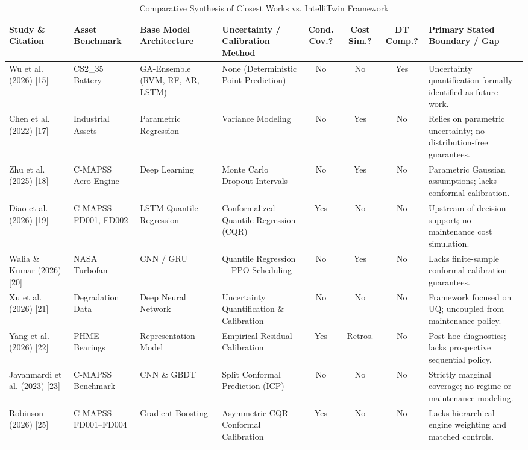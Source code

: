 \documentclass[12pt,a4paper]{article}
\begin{document}
\begin{table}[htbp]
\centering
\caption{Comparative Synthesis of Closest Works vs. IntelliTwin Framework}
\label{tab:closest_works}
\fontsize{8.5pt}{11pt}\selectfont
\begin{tabularx}{\textwidth}{l p{2.2cm} p{2.5cm} p{2.5cm} c c c p{2.5cm}}
\toprule
\textbf{Study \& Citation} & \textbf{Asset Benchmark} & \textbf{Base Model Architecture} & \textbf{Uncertainty / Calibration Method} & \textbf{Cond. Cov.?} & \textbf{Cost Sim.?} & \textbf{DT Comp.?} & \textbf{Primary Stated Boundary / Gap} \\
\midrule
Wu et al. (2026) [15] & CS2\_35 Battery & GA-Ensemble (RVM, RF, AR, LSTM) & None (Deterministic Point Prediction) & No & No & Yes & Uncertainty quantification formally identified as future work. \\
Chen et al. (2022) [17] & Industrial Assets & Parametric Regression & Variance Modeling & No & Yes & No & Relies on parametric uncertainty; no distribution-free guarantees. \\
Zhu et al. (2025) [18] & C-MAPSS Aero-Engine & Deep Learning & Monte Carlo Dropout Intervals & No & Yes & No & Parametric Gaussian assumptions; lacks conformal calibration. \\
Diao et al. (2026) [19] & C-MAPSS FD001, FD002 & LSTM Quantile Regression & Conformalized Quantile Regression (CQR) & Yes & No & No & Upstream of decision support; no maintenance cost simulation. \\
Walia \& Kumar (2026) [20] & NASA Turbofan & CNN / GRU & Quantile Regression + PPO Scheduling & No & Yes & No & Lacks finite-sample conformal calibration guarantees. \\
Xu et al. (2026) [21] & Degradation Data & Deep Neural Network & Uncertainty Quantification \& Calibration & No & No & No & Framework focused on UQ; uncoupled from maintenance policy. \\
Yang et al. (2026) [22] & PHME Bearings & Representation Model & Empirical Residual Calibration & Yes & Retros. & No & Post-hoc diagnostics; lacks prospective sequential policy. \\
Javanmardi et al. (2023) [23] & C-MAPSS Benchmark & CNN \& GBDT & Split Conformal Prediction (ICP) & No & No & No & Strictly marginal coverage; no regime or maintenance modeling. \\
Robinson (2026) [25] & C-MAPSS FD001--FD004 & Gradient Boosting & Asymmetric CQR Conformal Calibration & Yes & No & No & Lacks hierarchical engine weighting and matched controls. \\

\end{tabularx}
\end{table}
\end{document}
